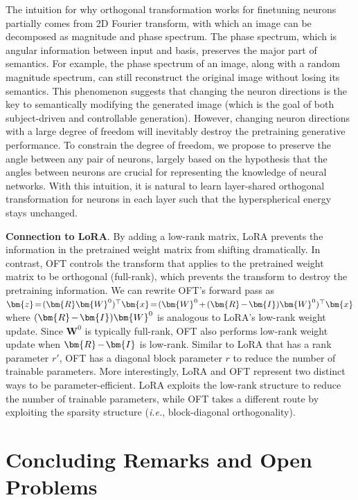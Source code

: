 The intuition for why orthogonal transformation works for finetuning neurons partially comes from 2D Fourier transform, with which an image can be decomposed as magnitude and phase spectrum. The phase spectrum, which is angular information between input and basis, preserves the major part of semantics. For example, the phase spectrum of an image, along with a random magnitude spectrum, can still reconstruct the original image without losing its semantics. This phenomenon suggests that changing the neuron directions is the key to semantically modifying the generated image (which is the goal of both subject-driven and controllable generation). However, changing neuron directions with a large degree of freedom will inevitably destroy the pretraining generative performance. To constrain the degree of freedom, we propose to preserve the angle between any pair of neurons, largely based on the hypothesis that the angles between neurons are crucial for representing the knowledge of neural networks. With this intuition, it is natural to learn layer-shared orthogonal transformation for neurons in each layer such that the hyperspherical energy stays unchanged.

\textbf{Connection to LoRA}. By adding a low-rank matrix, LoRA prevents the information in the pretrained weight matrix from shifting dramatically. In contrast, OFT controls the transform that applies to the pretrained weight matrix to be orthogonal (full-rank), which prevents the transform to destroy the pretraining information. We can rewrite OFT's forward pass as $\thickmuskip=2mu \medmuskip=2mu \bm{z}=(\bm{R}\bm{W}^0)^\top\bm{x}=(\bm{W}^0+(\bm{R}-\bm{I})\bm{W}^0)^\top\bm{x}$ where $\thickmuskip=2mu \medmuskip=2mu (\bm{R}-\bm{I})\bm{W}^0$ is analogous to LoRA's low-rank weight update. Since $\bm{W}^0$ is typically full-rank, OFT also performs low-rank weight update when $\thickmuskip=2mu \medmuskip=2mu \bm{R}-\bm{I}$ is low-rank. Similar to LoRA that has a rank parameter $r'$, OFT has a diagonal block parameter $r$ to reduce the number of trainable parameters. More interestingly, LoRA and OFT represent two distinct ways to be parameter-efficient. LoRA exploits the low-rank structure to reduce the number of trainable parameters, while OFT takes a different route by exploiting the sparsity structure (\emph{i.e.}, block-diagonal orthogonality).

\section{Concluding Remarks and Open Problems}

